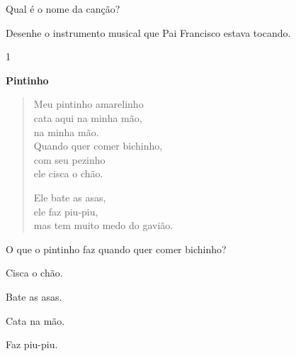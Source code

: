 
\begin{escolha}
\item Qual é o nome da canção?


\item Desenhe o instrumento musical que Pai Francisco estava tocando.

\begin{mdframed}[linewidth=2pt,linecolor=salmao,roundcorner=10pt]
\vspace{5cm}
\end{mdframed}
\end{escolha}


\num{1}

\textbf{Pintinho}

\begin{verse}
Meu pintinho amarelinho\\
cata aqui na minha mão,\\ 
na minha mão.\\
Quando quer comer bichinho,\\ 
com seu pezinho\\ 
ele cisca o chão.

Ele bate as asas,\\
ele faz piu-piu,\\ 
mas tem muito medo do gavião.
\end{verse}


O que o pintinho faz quando quer comer bichinho?

\begin{minipage}{.5\textwidth}
\begin{escolha}
	\item Cisca o chão.

	\item Bate as asas.

	\item Cata na mão.

	\item Faz piu-piu.
\end{escolha}
\end{minipage}

